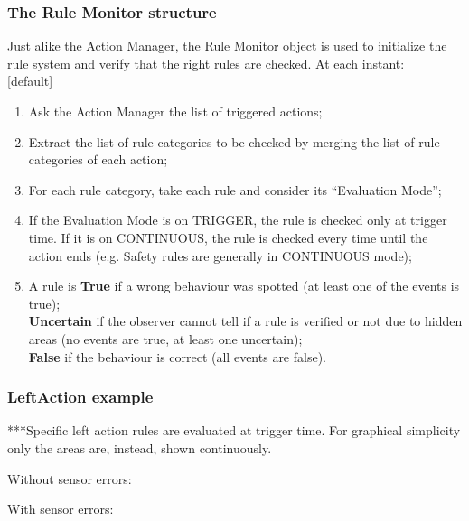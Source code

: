 \documentclass{beamer}
\begin{document}
\begin{frame}

\frametitle{The Rule Monitor structure}
Just alike the Action Manager, the Rule Monitor object is used to initialize
the rule system and verify that the right rules are checked. At each instant:\\

[default]
\begin{enumerate}
\item<+-> Ask the Action Manager the list of triggered actions;\\ 
\item<+-> Extract the list of rule categories to be checked by merging the
	list of rule categories of each action;
\item<+-> For each rule category, take each rule and consider its ``Evaluation Mode'';
\item<+-> If the Evaluation Mode is on TRIGGER, the rule is checked only at trigger time. If it is on CONTINUOUS, the rule is checked every time until the action ends (e.g. Safety rules are generally in CONTINUOUS mode);
\item<+-> A rule is \textbf{True} if a wrong behaviour was spotted (at least one of the events is true);\\
\textbf{Uncertain} if the observer cannot tell 
if a rule is verified or not due to hidden areas (no events are true, at least one uncertain);\\
\textbf{False} if the behaviour is correct  (all events are false).
\end{enumerate}
\end{frame}

\begin{frame}
\frametitle{LeftAction example}

***Specific left action rules are evaluated at trigger time. For graphical simplicity only the areas are, instead, shown continuously.

Without sensor errors:\\

\bigskip
\bigskip

With sensor errors:\\

\end{frame}
\end{document}
